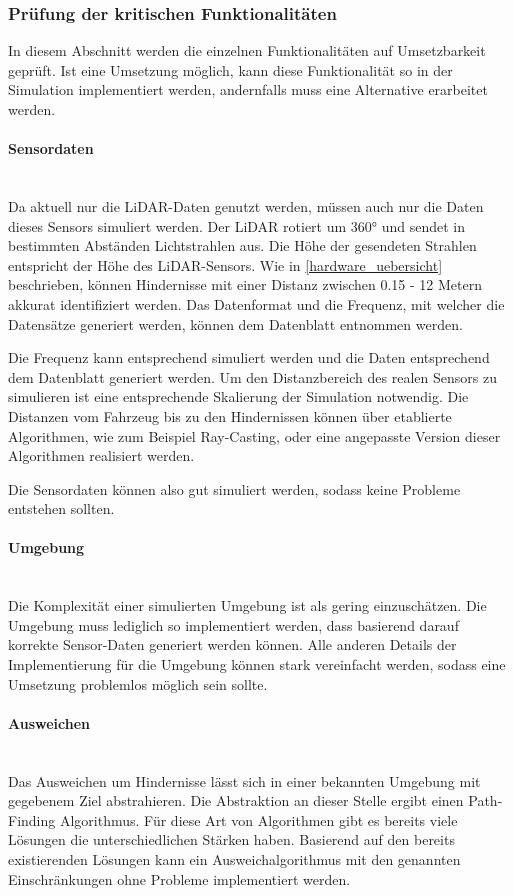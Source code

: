 \subsubsection{Prüfung der kritischen Funktionalitäten}
\label{pr}

In diesem Abschnitt werden die einzelnen Funktionalitäten auf Umsetzbar\-keit geprüft. 
Ist eine Umsetzung möglich, kann diese Funktionalität so in der Simulation implementiert werden, andernfalls muss eine Alternative erarbeitet werden.

\paragraph{Sensordaten} \mbox{}\\
Da aktuell nur die LiDAR-Daten genutzt werden, müssen auch nur die Daten dieses Sensors simuliert werden.
Der LiDAR rotiert um 360° und sendet in bestimmten Abständen Lichtstrahlen aus. 
Die Höhe der gesendeten Strahlen entspricht der Höhe des LiDAR-Sensors.
Wie in \ref{hardware_uebersicht} beschrieben, können Hindernisse mit einer Distanz zwischen 0.15 - 12 Metern akkurat identifiziert werden. 
Das Datenformat und die Frequenz, mit welcher die Datensätze generiert werden, können dem Datenblatt \cite{Slamtec2020} entnommen werden.

Die Frequenz kann entsprechend simuliert werden und die Daten entsprech\-end dem Datenblatt generiert werden. 
Um den Distanzbereich des realen Sensors zu simulieren ist eine entsprechende Skalierung der Simulation notwendig.
Die Distanzen vom Fahrzeug bis zu den Hindernissen können über etablierte Algorithmen, wie zum Beispiel Ray-Casting, 
oder eine angepasste Version dieser Algorithmen realisiert werden.

Die Sensordaten können also gut simuliert werden, sodass keine Probleme entstehen sollten.

\paragraph{Umgebung} \mbox{}\\
Die Komplexität einer simulierten Umgebung ist als gering einzuschätzen.
Die Umgebung muss lediglich so implementiert werden, dass basierend darauf korrekte Sensor-Daten generiert werden können.
Alle anderen Details der Implementierung für die Umgebung können stark vereinfacht werden, sodass eine Umsetzung problemlos möglich sein sollte.

\paragraph{Ausweichen} \mbox{}\\
Das Ausweichen um Hindernisse lässt sich in einer bekannten Umgebung mit gegebenem Ziel abstrahieren. 
Die Abstraktion an dieser Stelle ergibt einen Path-Finding Algorithmus. 
Für diese Art von Algorithmen gibt es bereits viele Lösungen die unterschiedlichen Stärken haben.
Basierend auf den bereits existierenden Lösungen kann ein Ausweichalgorithmus mit den genannten Einschränkungen ohne Probleme implementiert werden. 

